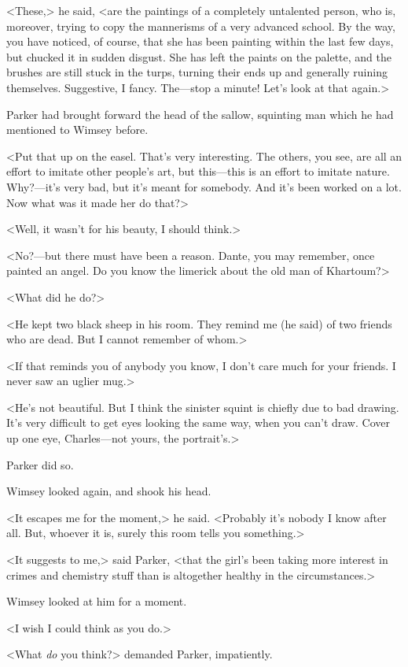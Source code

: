<These,> he said, <are the paintings of a completely untalented person, who is, moreover, trying to copy the mannerisms of a very advanced school. By the way, you have noticed, of course, that she has been painting within the last few days, but chucked it in sudden disgust. She has left the paints on the palette, and the brushes are still stuck in the turps, turning their ends up and generally ruining themselves. Suggestive, I fancy. The—stop a minute! Let's look at that again.>

Parker had brought forward the head of the sallow, squinting man which he had mentioned to Wimsey before.

<Put that up on the easel. That's very interesting. The others, you see, are all an effort to imitate other people's art, but this—this is an effort to imitate nature. Why?—it's very bad, but it's meant for somebody. And it's been worked on a lot. Now what was it made her do that?>

<Well, it wasn't for his beauty, I should think.>

<No?—but there must have been a reason. Dante, you may remember, once painted an angel. Do you know the limerick about the old man of Khartoum?>

<What did he do?>

<He kept two black sheep in his room. They remind me (he said) of two friends who are dead. But I cannot remember of whom.>

<If that reminds you of anybody you know, I don't care much for your friends. I never saw an uglier mug.>

<He's not beautiful. But I think the sinister squint is chiefly due to bad drawing. It's very difficult to get eyes looking the same way, when you can't draw. Cover up one eye, Charles—not yours, the portrait's.>

Parker did so.

Wimsey looked again, and shook his head.

<It escapes me for the moment,> he said. <Probably it's nobody I know after all. But, whoever it is, surely this room tells you something.>

<It suggests to me,> said Parker, <that the girl's been taking more interest in crimes and chemistry stuff than is altogether healthy in the circumstances.>

Wimsey looked at him for a moment.

<I wish I could think as you do.>

<What \emph{do} you think?> demanded Parker, impatiently.

